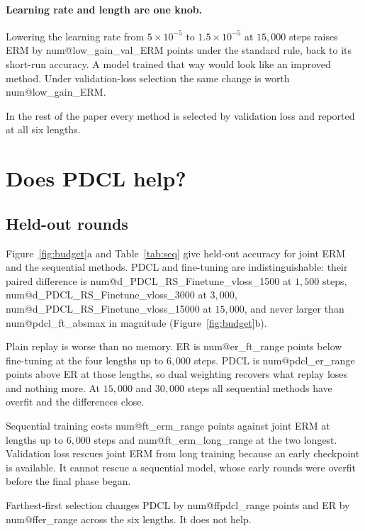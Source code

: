 \documentclass[10pt]{article}
\makeatletter
\newcommand{\num}[1]{\csname num@#1\endcsname}
\makeatother
\begin{document}
\paragraph{Learning rate and length are one knob.}
Lowering the learning rate from $5\times10^{-5}$ to $1.5\times10^{-5}$ at $15{,}000$ steps raises ERM by \num{low_gain_val_ERM} points under the standard rule, back to its short-run accuracy. A model trained that way would look like an improved method. Under validation-loss selection the same change is worth \num{low_gain_ERM}.

In the rest of the paper every method is selected by validation loss and reported at all six lengths.

\section{Does PDCL help?}
\label{sec:pdcl}

\subsection{Held-out rounds}

Figure~\ref{fig:budget}a and Table~\ref{tab:seq} give held-out accuracy for joint ERM and the sequential methods. PDCL and fine-tuning are indistinguishable: their paired difference is \num{d_PDCL_RS_Finetune_vloss_1500} at $1{,}500$ steps, \num{d_PDCL_RS_Finetune_vloss_3000} at $3{,}000$, \num{d_PDCL_RS_Finetune_vloss_15000} at $15{,}000$, and never larger than \num{pdcl_ft_absmax} in magnitude (Figure~\ref{fig:budget}b).

Plain replay is worse than no memory. ER is \num{er_ft_range} points below fine-tuning at the four lengths up to $6{,}000$ steps. PDCL is \num{pdcl_er_range} points above ER at those lengths, so dual weighting recovers what replay loses and nothing more. At $15{,}000$ and $30{,}000$ steps all sequential methods have overfit and the differences close.

Sequential training costs \num{ft_erm_range} points against joint ERM at lengths up to $6{,}000$ steps and \num{ft_erm_long_range} at the two longest. Validation loss rescues joint ERM from long training because an early checkpoint is available. It cannot rescue a sequential model, whose early rounds were overfit before the final phase began.

Farthest-first selection changes PDCL by \num{ffpdcl_range} points and ER by \num{ffer_range} across the six lengths. It does not help.
\end{document}
